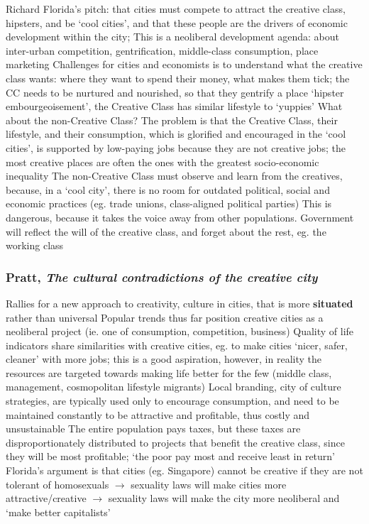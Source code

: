 \documentclass{article}
\begin{document}
\begin{outline}
	\1 Richard Florida's pitch: that cities must compete to attract the creative class, hipsters, and be `cool cities', and that these people are the drivers of economic development within the city; 
		\2 This is a neoliberal development agenda: about inter-urban competition, gentrification, middle-class consumption, place marketing
	\1 Challenges for cities and economists is to understand what the creative class wants: where they want to spend their money, what makes them tick; the CC needs to be nurtured and nourished, so that they gentrify a place 
	\1 `hipster embourgeoisement', the Creative Class has similar lifestyle to `yuppies'
	\1 What about the non-Creative Class?
		\2 The problem is that the Creative Class, their lifestyle, and their consumption, which is glorified and encouraged in the `cool cities', is supported by low-paying jobs because they are not creative jobs; the most creative places are often the ones with the greatest socio-economic inequality
		\2 The non-Creative Class must observe and learn from the creatives, because, in a `cool city', there is no room for outdated political, social and economic practices (eg. trade unions, class-aligned political parties)
		\2 This is dangerous, because it takes the voice away from other populations. Government will reflect the will of the creative class, and forget about the rest, eg. the working class
\end{outline}

\subsubsection{Pratt, \textit{The cultural contradictions of the creative city}}

\begin{outline}
	\1 Rallies for a new approach to creativity, culture in cities, that is more \textbf{situated} rather than universal
	\1 Popular trends thus far position creative cities as a neoliberal project (ie. one of consumption, competition, business)
	\1 Quality of life indicators share similarities with creative cities, eg. to make cities `nicer, safer, cleaner' with more jobs; this is a good aspiration, however, in reality the resources are targeted towards making life better for the few (middle class, management, cosmopolitan lifestyle migrants)
	\1 Local branding, city of culture strategies, are typically used only to encourage consumption, and need to be maintained constantly to be attractive and profitable, thus costly and unsustainable 
	\1 The entire population pays taxes, but these taxes are disproportionately distributed to projects that benefit the creative class, since they will be most profitable; `the poor pay most and receive least in return'
	\1 Florida's argument is that cities (eg. Singapore) cannot be creative if they are not tolerant of homosexuals $\rightarrow$ sexuality laws will make cities more attractive/creative $\rightarrow$ sexuality laws will make the city more neoliberal and `make better capitalists'
	\1
\end{outline}
\end{document}
